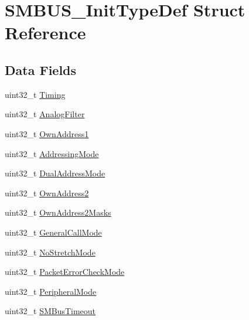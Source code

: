 \hypertarget{struct_s_m_b_u_s___init_type_def}{}\section{S\+M\+B\+U\+S\+\_\+\+Init\+Type\+Def Struct Reference}
\label{struct_s_m_b_u_s___init_type_def}
\subsection*{Data Fields}
\begin{DoxyCompactItemize}
\item 
uint32\+\_\+t \hyperlink{struct_s_m_b_u_s___init_type_def_acd4afe05c37d7924e50f6795641dbd70}{Timing}
\item 
uint32\+\_\+t \hyperlink{struct_s_m_b_u_s___init_type_def_a686738e87b5427853f153bcf9344bd63}{Analog\+Filter}
\item 
uint32\+\_\+t \hyperlink{struct_s_m_b_u_s___init_type_def_a8abec5c168e27bf11b2808c1450bdeda}{Own\+Address1}
\item 
uint32\+\_\+t \hyperlink{struct_s_m_b_u_s___init_type_def_aa7afcb44ef1f351763d7dc69ba0f4f8c}{Addressing\+Mode}
\item 
uint32\+\_\+t \hyperlink{struct_s_m_b_u_s___init_type_def_aabb4e156aa4af60dfaf591419e9b1a07}{Dual\+Address\+Mode}
\item 
uint32\+\_\+t \hyperlink{struct_s_m_b_u_s___init_type_def_a6300c7a7e1b7d5444226a1bd55744f53}{Own\+Address2}
\item 
uint32\+\_\+t \hyperlink{struct_s_m_b_u_s___init_type_def_a4fb48639ef769c55e617e6b97e63a531}{Own\+Address2\+Masks}
\item 
uint32\+\_\+t \hyperlink{struct_s_m_b_u_s___init_type_def_afc70f58c0935194064d720779fbf22b5}{General\+Call\+Mode}
\item 
uint32\+\_\+t \hyperlink{struct_s_m_b_u_s___init_type_def_a47971fd08a9784eddaa3d83fb998030c}{No\+Stretch\+Mode}
\item 
uint32\+\_\+t \hyperlink{struct_s_m_b_u_s___init_type_def_a83000ad39e33f28f05cd52e714d72373}{Packet\+Error\+Check\+Mode}
\item 
uint32\+\_\+t \hyperlink{struct_s_m_b_u_s___init_type_def_a3fdc14ef0737148ca9f769fc1e42846e}{Peripheral\+Mode}
\item 
uint32\+\_\+t \hyperlink{struct_s_m_b_u_s___init_type_def_a7fda7115824afc18c97a7a2f32886177}{S\+M\+Bus\+Timeout}
\end{DoxyCompactItemize}


